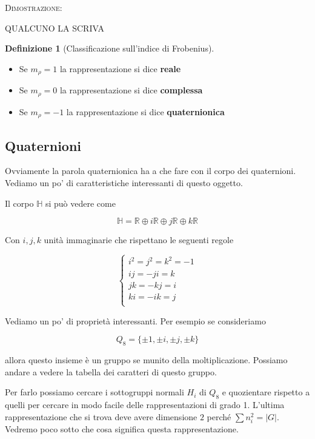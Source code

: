 \documentclass[11pt]{article}
\theoremstyle{plain}
\theoremstyle{definition}
\newtheorem{defn}{Definizione}[section]
\theoremstyle{remark}
\newcommand{\R}{\mathbb{R}}
\newcommand{\HH}{\mathbb{H}}
\begin{document}
\textsc{Dimostrazione:}

QUALCUNO LA SCRIVA


\begin{defn}[Classificazione sull'indice di Frobenius]

\begin{itemize}
\item Se $m_\rho = 1$ la rappresentazione si dice \textbf{reale}
\item Se $m_\rho = 0$ la rappresentazione si dice \textbf{complessa}
\item Se $m_\rho = -1$ la rappresentazione si dice \textbf{quaternionica}
\end{itemize}
\end{defn}


\subsection{Quaternioni}

Ovviamente la parola quaternionica ha a che fare con il corpo dei quaternioni. Vediamo un po' di caratteristiche interessanti di questo oggetto.

Il corpo $\HH$ si può vedere come

\[\HH = \R \oplus i \R \oplus j \R \oplus k \R \]

Con $i,j,k$ unità immaginarie che rispettano le seguenti regole

\[ 
\begin{cases}
i^2 = j^2 = k^2 = -1 \\
ij = - ji = k \\
jk = -kj = i \\
ki = - ik = j \\
\end{cases}
\]


Vediamo un po' di proprietà interessanti. Per esempio se consideriamo 

\[ Q_8 =  \{\pm 1, \pm i, \pm j, \pm k \}\]

allora questo insieme è un gruppo se munito della moltiplicazione. Possiamo andare a vedere la tabella dei caratteri di questo gruppo. 


Per farlo possiamo cercare i sottogruppi normali $H_i$ di $Q_8$ e quozientare rispetto a quelli per cercare in modo facile delle rappresentazioni di grado 1. L'ultima rappresentazione che si trova deve avere dimensione $2$ perché $\sum n_i^2 = |G|$. Vedremo poco sotto che cosa significa questa rappresentazione.
\end{document}
